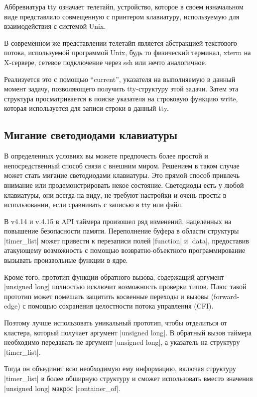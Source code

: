 \documentclass[10pt, oneside]{book}
\begin{document}
Аббревиатура tty означает телетайп, устройство, которое в своем изначальном виде представляло совмещенную с принтером клавиатуру, используемую для взаимодействия с системой Unix.

В современном же представлении телетайп является абстракцией текстового потока, используемой программой Unix, будь то физический терминал, xterm на X-сервере, сетевое подключение через ssh или нечто аналогичное.

Реализуется это с помощью ``current'', указателя на выполняемую в данный момент задачу, позволяющего получить tty-структуру этой задачи. Затем эта структура просматривается в поиске указателя на строковую функцию write, которая используется для записи строки в данный tty.


\subsection{Мигание светодиодами клавиатуры}
\label{sec:flash_kb_led}
В определенных условиях вы можете предпочесть более простой и непосредственный способ связи с внешним миром. Решением в таком случае может стать мигание
светодиодами клавиатуры. Это прямой способ привлечь внимание или продемонстрировать некое состояние. Светодиоды есть у любой клавиатуры, они всегда
на виду, не требуют настройки и очень просты в использовании, если сравнивать с записью в tty или файл.

В v4.14 и v.4.15 в API таймера произошел ряд изменений, нацеленных на повышение безопасности памяти. Переполнение буфера в области структуры \cpp|timer_list| может привести к перезаписи полей \cpp|function| и \cpp|data|, предоставив атакующему возможность с
помощью возвратно-объектного программирование вызывать произвольные функции в ядре.

Кроме того, прототип функции обратного вызова, содержащий аргумент \cpp|unsigned long| полностью исключит возможность проверки типов. Плюс такой прототип может помешать защитить косвенные переходы и вызовы (forward-edge) с помощью сохранения целостности потока управления (CFI).

Поэтому лучше использовать уникальный прототип, чтобы отделиться от кластера, который получает аргумент \cpp|unsigned long|. В обратный вызов таймера необходимо передавать не аргумент \cpp|unsigned long|, а указатель на структуру \cpp|timer_list|.

Тогда он объединит всю необходимую ему информацию, включая структуру \cpp|timer_list| в более обширную структуру и сможет использовать вместо значения \cpp|unsigned long| макрос \cpp|container_of|.
\end{document}
